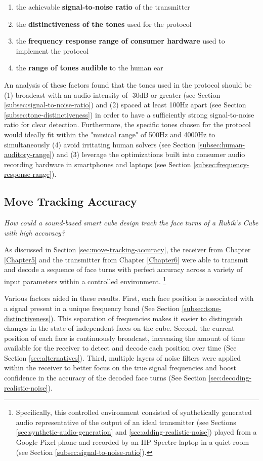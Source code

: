 \begin{enumerate}
    \item the achievable \textbf{signal-to-noise ratio} of the transmitter
    \item the \textbf{distinctiveness of the tones} used for the protocol
    \item the \textbf{frequency response range of consumer hardware} used to implement the protocol
    \item the \textbf{range of tones audible} to the human ear
\end{enumerate}

An analysis of these factors found that the tones used in the protocol
should be (1) broadcast with an audio intensity of -30dB or greater
(see Section \ref{subsec:signal-to-noise-ratio}) and (2) spaced at
least 100Hz apart (see Section \ref{subsec:tone-distinctiveness}) in
order to have a sufficiently strong signal-to-noise ratio for clear
detection. Furthermore, the specific tones chosen for the protocol
would ideally fit within the "musical range" of 500Hz and 4000Hz to
simultaneously (4) avoid irritating human solvers (see Section
\ref{subsec:human-auditory-range}) and (3) leverage the optimizations
built into consumer audio recording hardware in smartphones and laptops
(see Section \ref{subsec:frequency-response-range}).

\subsection{Move Tracking Accuracy}
\label{subsec:answer-accuracy}

\emph{How could a sound-based smart cube design track the face turns of
a Rubik's Cube with high accuracy?}

As discussed in Section \ref{sec:move-tracking-accuracy}, the receiver
from Chapter \ref{Chapter5} and the transmitter from Chapter
\ref{Chapter6} were able to transmit and decode a sequence of face
turns with perfect accuracy across a variety of input parameters within
a controlled environment. \footnote{Specifically, this controlled
environment consisted of synthetically generated audio representative
of the output of an ideal transmitter (see Sections
\ref{sec:synthetic-audio-generation} and
\ref{sec:adding-realistic-noise}) played from a Google Pixel phone and
recorded by an HP Spectre laptop in a quiet room (see Section
\ref{subsec:signal-to-noise-ratio}).}

Various factors aided in these results. First, each face position is
associated with a signal present in a unique frequency band (See
Section \ref{subsec:tone-distinctiveness}). This separation of
frequencies makes it easier to distinguish changes in the state of
independent faces on the cube. Second, the current position of each
face is continuously broadcast, increasing the amount of time available
for the receiver to detect and decode each position over time (See
Section \ref{sec:alternatives}). Third, multiple layers of noise
filters were applied within the receiver to better focus on the true
signal frequencies and boost confidence in the accuracy of the decoded
face turns (See Section \ref{sec:decoding-realistic-noise}).


